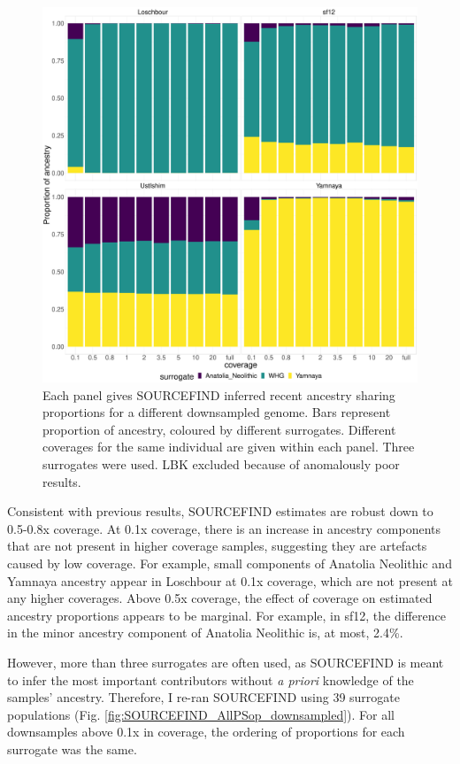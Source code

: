 \begin{figure}[htp]
    \centering
    \includegraphics[width=1.0\textwidth]{../images/chapter1/3pop_SF_downsampled.pdf}
    \caption{Each panel gives SOURCEFIND inferred recent ancestry sharing proportions for a different downsampled genome. Bars represent proportion of ancestry, coloured by different surrogates. Different coverages for the same individual are given within each panel. Three surrogates were used. LBK excluded because of anomalously poor results.}
    \label{fig:3pop_SF_downsampled}
\end{figure}

Consistent with previous results, SOURCEFIND estimates are robust down to 0.5-0.8x coverage. At 0.1x coverage, there is an increase in ancestry components that are not present in higher coverage samples, suggesting they are artefacts caused by low coverage. For example, small components of Anatolia Neolithic and Yamnaya ancestry appear in Loschbour at 0.1x coverage, which are not present at any higher coverages. Above 0.5x coverage, the effect of coverage on estimated ancestry proportions appears to be marginal. For example, in sf12, the difference in the minor ancestry component of Anatolia Neolithic is, at most, 2.4\%.

However, more than three surrogates are often used, as SOURCEFIND is meant to infer the most important contributors without \textit{a priori} knowledge of the samples' ancestry. Therefore, I re-ran SOURCEFIND using 39 surrogate populations (Fig. \ref{fig:SOURCEFIND_AllPSop_downsampled}). For all downsamples above 0.1x in coverage, the ordering of proportions for each surrogate was the same. 

